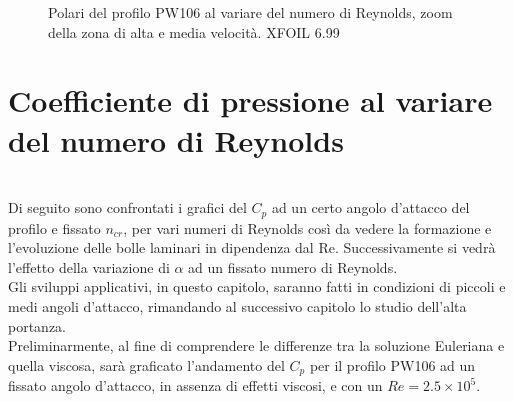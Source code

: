 \begin{figure} [H]
\centering
{}
\caption{\footnotesize Polari del profilo PW106 al variare del numero di Reynolds, zoom della zona di alta e media velocità. XFOIL 6.99 }
\label{fig:pol}
\end{figure}


\section{Coefficiente di pressione al variare del numero di Reynolds }

\noindent \\ 

Di seguito sono confrontati i grafici del $C_p$ ad un certo angolo d’attacco del profilo e fissato $n_{cr}$, per vari numeri di Reynolds così da vedere la formazione e l’evoluzione delle bolle laminari in dipendenza dal Re. Successivamente si vedrà l’effetto della variazione di ${\alpha}$  ad un fissato numero di Reynolds. \\
Gli sviluppi applicativi, in questo capitolo, saranno fatti in condizioni di piccoli e medi angoli d'attacco, rimandando al successivo capitolo lo studio dell'alta portanza.\\
Preliminarmente, al fine di comprendere le differenze tra la soluzione Euleriana e quella viscosa, sarà graficato l'andamento del $C_p$ per il profilo PW106 ad un fissato angolo d’attacco, in assenza di effetti viscosi, e con un $Re=2.5\times10^5$.\\


